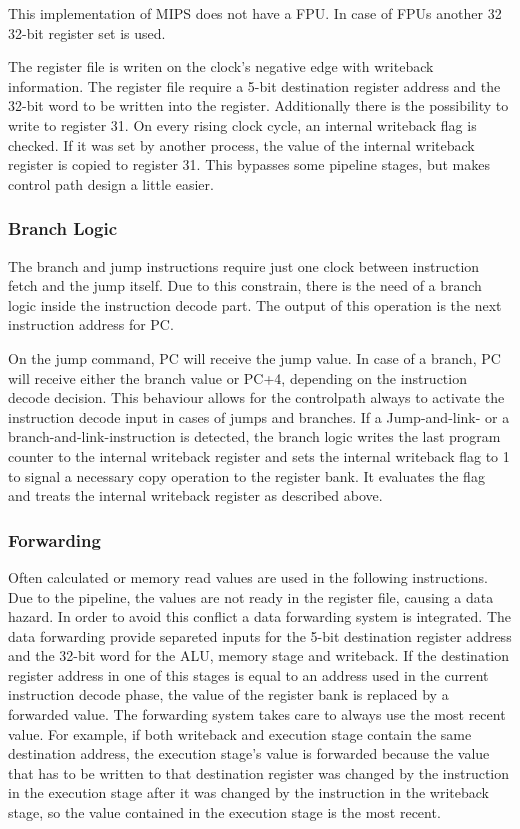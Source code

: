 This implementation of MIPS does not have a FPU. In case of FPUs another 32 32-bit register set is used.

The register file is writen on the clock's negative edge with writeback information. The register file require a 5-bit destination register address and the 32-bit word to be written into the register. 
Additionally there is the possibility to write to register 31. On every rising clock cycle, an internal writeback flag is checked. If it was set by another process, 
the value of the internal writeback register is copied to register 31. This bypasses some pipeline stages, but makes control path design a little easier.
\subsubsection{Branch Logic}
The branch and jump instructions require just one clock between instruction fetch and the jump itself. Due to this constrain, there is the need of a branch logic inside
the instruction decode part. The output of this operation is the next instruction address for PC. 

On the jump command, PC will receive the jump value. 
In case of a branch, PC will receive either the branch value or PC+4, depending on the instruction decode decision. This behaviour allows for the controlpath always to 
activate the instruction decode input in cases of jumps and branches. If a Jump-and-link- or a branch-and-link-instruction is detected, the branch logic writes the last 
program counter to the internal writeback register and sets the internal writeback flag to 1 to signal a necessary copy operation to the register bank. 
It evaluates the flag and treats the internal writeback register as described above.
\subsubsection{Forwarding}
Often calculated or memory read values are used in the following instructions. Due to the pipeline, the values are not ready in the register file, causing a data hazard. In order to avoid this conflict
a data forwarding system is integrated. The data forwarding provide separeted inputs for the 5-bit destination register address and the 32-bit word for the ALU, memory stage and writeback. 
If the destination register address in one of this stages is equal to an address used in the current instruction decode phase, the value of the register bank is replaced by a forwarded value. 
The forwarding system takes care to always use the most recent value. For example, if both writeback and execution stage contain the same destination address, 
the execution stage's value is forwarded because the value that has to be written to that destination register was changed by the instruction in the execution stage after 
it was changed by the instruction in the writeback stage, so the value contained in the execution stage is the most recent.


